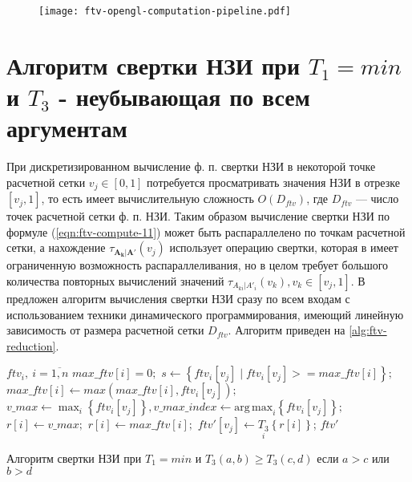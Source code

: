 \begin{figure}[hbt]
	\centering
   	\texttt{[image: ftv-opengl-computation-pipeline.pdf]}
	\label{ftv-opengl-computation-pipeline}
\end{figure}

\section{Алгоритм свертки НЗИ при $T_1=min$ и $T_3$ - неубывающая по всем аргументам}\label{sec:ch3/sect2}

При дискретизированном вычисление ф. п. свертки НЗИ в некоторой точке расчетной сетки $v_j\in [0,1]$ потребуется просматривать значения НЗИ в отрезке $[v_j, 1]$, то есть имеет вычислительную сложность $O(D_{ftv})$, где $D_{ftv}$ --- число точек расчетной сетки ф. п. НЗИ. Таким образом вычисление свертки НЗИ по формуле (\ref{eqn:ftv-compute-11}) может быть распараллелено по точкам расчетной сетки, а нахождение $\tau_{\mathbf{A_k}|\mathbf{A'}}(v_j)$ использует операцию свертки, которая в имеет ограниченную возможность распараллеливания, но в целом требует большого количества повторных вычислений значений $\tau_{A_{ki}|A'_i}(v_k), v_k\in [v_j, 1]$. В \cite{Karatach2024} предложен алгоритм вычисления свертки НЗИ сразу по всем входам с использованием техники динамического программирования, имеющий линейную зависимость от размера расчетной сетки $D_{ftv}$. Алгоритм приведен на \cref{alg:ftv-reduction}.

\begin{algorithm}
\begin{algorithmic}
\Require $ftv_i,\ i=\overline{1,n}$
\State $max\_ftv[i] = 0;$
\State $s \gets \left\{ftv_i[v_j] \mid ftv_i[v_j] >= max\_ftv[i]\right\};$
\State $max\_ftv[i] \gets max(max\_ftv[i], ftv_i[v_j]);$
\State $v\_max \gets \max_{i}\left\{ftv_i[v_j]\right\}, v\_max\_index \gets \mathrm{arg\,max}_i\left\{ftv_i[v_j]\right\};$
\State $r[i] \gets v\_max;$
\Else
\State $r[i] \gets max\_ftv[i];$
\EndIf
\State $ftv'[v_j] \gets \underset{i}{T_3}\left\{r[i]\right\}$;
\EndFor
\State \Return $ftv'$
\end{algorithmic}
\caption{Алгоритм свертки НЗИ при $T_1=min$ и $T_3(a, b) \ge T_3(c, d)$ если $a > c$ или $b > d$}
\label{alg:ftv-reduction}
\end{algorithm}

